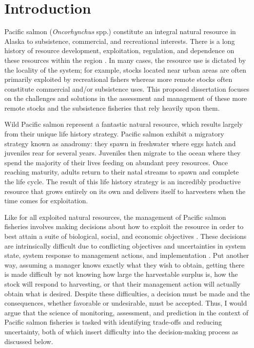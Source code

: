 \documentclass[12pt,]{book}
\theoremstyle{definition}
\theoremstyle{definition}
\theoremstyle{definition}
\theoremstyle{remark}
\begin{document}
\chapter{Introduction}\label{ch1}

Pacific salmon (\emph{Oncorhynchus} spp.) constitute an integral natural
resource in Alaska to subsistence, commercial, and recreational
interests. There is a long history of resource development,
exploitation, regulation, and dependence on these resources within the
region \citep{cooley-1963}. In many cases, the resource use is dictated
by the locality of the system; for example, stocks located near urban
areas are often primarily exploited by recreational fishers whereas more
remote stocks often constitute commercial and/or subsistence uses. This
proposed dissertation focuses on the challenges and solutions in the
assessment and management of these more remote stocks and the
subsistence fisheries that rely heavily upon them.

Wild Pacific salmon represent a fantastic natural resource, which
results largely from their unique life history strategy. Pacific salmon
exhibit a migratory strategy known as anadromy: they spawn in freshwater
where eggs hatch and juveniles rear for several years. Juveniles then
migrate to the ocean where they spend the majority of their lives
feeding on abundant prey resources. Once reaching maturity, adults
return to their natal streams to spawn and complete the life cycle. The
result of this life history strategy is an incredibly productive
resource that grows entirely on its own and delivers itself to
harvesters when the time comes for exploitation.

Like for all exploited natural resources, the management of Pacific
salmon fisheries involves making decisions about how to exploit the
resource in order to best attain a suite of biological, social, and
economic objectives \citep{walters-1986}. These decisions are
intrinsically difficult due to conflicting objectives and uncertainties
in system state, system response to management actions, and
implementation \citep{walters-holling-1990}. Put another way, assuming a
manager knows exactly what they wish to obtain, getting there is made
difficult by not knowing how large the harvestable surplus is, how the
stock will respond to harvesting, or that their management action will
actually obtain what is desired. Despite these difficulties, a decision
must be made \citep[without decision-making there is no
management;][]{hilborn-walters-1992} and the consequences, whether
favorable or undesirable, must be accepted. Thus, I would argue that the
science of monitoring, assessment, and prediction in the context of
Pacific salmon fisheries is tasked with identifying trade-offs and
reducing uncertainty, both of which insert difficulty into the
decision-making process as discussed below.
\end{document}
